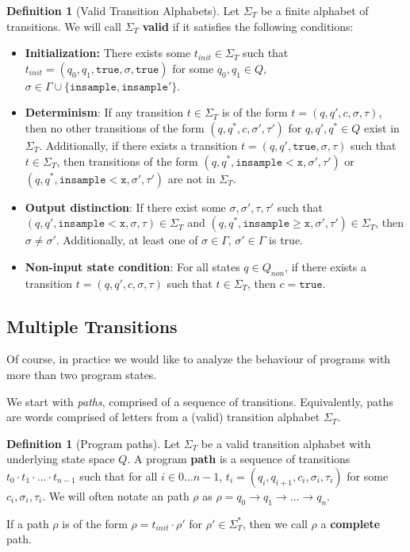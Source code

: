 \documentclass[12pt]{article}
\newcommand{\gguard}[1][x]{\texttt{insample}\geq #1}
\newcommand{\lguard}[1][x]{\texttt{insample} < #1}
\theoremstyle{definition}
\newtheorem{defn}[thm]{Definition}
\begin{document}
\begin{defn}[Valid Transition Alphabets]
    Let $\Sigma_T$ be a finite alphabet of transitions. We will call $\Sigma_T$ \textbf{valid} if it satisfies the following conditions:
    \begin{itemize}
        \item \textbf{Initialization:} There exists some $t_{init}\in \Sigma_T$ such that $t_{init} = (q_0, q_1, \texttt{true}, \sigma, \texttt{true})$ for some $q_0, q_1\in Q$, $\sigma \in \Gamma\cup\{\texttt{insample}, \texttt{insample}'\}$. 
        \item \textbf{Determinism}: If any transition $t\in \Sigma_T$ is of the form $t=(q, q', c, \sigma, \tau)$, then no other transitions of the form $(q, q^*, c, \sigma', \tau')$ for $q, q', q^*\in Q$ exist in $\Sigma_T$. 
        Additionally, if there exists a transition $t=(q, q', \texttt{true}, \sigma, \tau)$ such that $t\in \Sigma_T$, then transitions of the form $(q, q^*, \lguard[\texttt{x}], \sigma', \tau')$ or $(q, q^*, \lguard[\texttt{x}], \sigma', \tau')$ are not in $\Sigma_T$. 
        \item \textbf{Output distinction}: If there exist some $\sigma, \sigma', \tau, \tau'$ such that $(q, q', \lguard[\texttt{x}], \sigma, \tau)\in \Sigma_T$  and $(q, q^*, \gguard[\texttt{x}], \sigma', \tau') \in \Sigma_T$, then $\sigma \neq \sigma'$. Additionally, at least one of $\sigma\in \Gamma$, $\sigma'\in \Gamma$ is true.
        \item \textbf{Non-input state condition}: For all states $q\in Q_{non}$, if there exists a transition $t=(q, q', c, \sigma, \tau)$ such that $t\in \Sigma_T$, then $c = \texttt{true}$.
    \end{itemize}
\end{defn}

\subsection{Multiple Transitions}

Of course, in practice we would like to analyze the behaviour of programs with more than two program states.

We start with \textit{paths}, comprised of a sequence of transitions. Equivalently, paths are words comprised of letters from a (valid) transition alphabet $\Sigma_T$. 

\begin{defn}[Program paths]
    Let $\Sigma_T$ be a valid transition alphabet with underlying state space $Q$. A program \textbf{path} is a sequence of transitions $t_0\cdot t_1\cdot \ldots\cdot t_{n-1}$ such that for all $i\in 0\ldots n-1$, $t_i = (q_i, q_{i+1}, c_i, \sigma_i, \tau_i)$ for some $c_i, \sigma_i, \tau_i$. We will often notate an path $\rho$ as $\rho = q_0\to q_1\to \ldots \to q_n$. 

    If a path $\rho$ is of the form $\rho = t_{init}\cdot \rho'$ for $\rho'\in \Sigma_T^*$, then we call $\rho$ a \textbf{complete} path. 
\end{defn}
\end{document}
